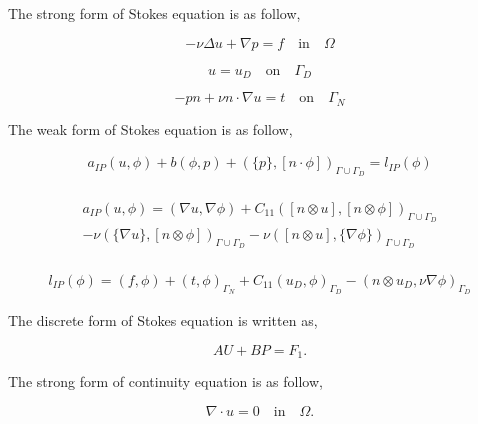 \documentclass[a4paper,12pt]{book}
\begin{document}
The strong form of Stokes equation is as follow,

\begin{equation} \label{stokes_strong_form_ch3}
-\nu \Delta u + \nabla p = f \quad \textrm{in} \quad \Omega
\end{equation}

\begin{equation} \label{dirichlet condition stokes_ch3}
u = u_D \quad \textrm{on} \quad \Gamma_D
\end{equation}

\begin{equation} \label{neumann condition stokes_ch3}
-pn + \nu n \cdot \nabla u = t \quad \textrm{on} \quad \Gamma_N
\end{equation}

The weak form of Stokes equation is as follow,

\begin{equation}\label{stokes_weak_ch3}
\begin{split}
a_{IP}(u,\phi) + b(\phi,p) + (\{p\},[n\cdot \phi])_{\Gamma \cup \Gamma_D} = l_{IP}(\phi) 
\end{split}
\end{equation}
\\
\begin{equation}
\begin{split}
a_{IP}(u,\phi) = (\nabla u, \nabla \phi) + C_{11} ([n \otimes u],[n \otimes \phi])_{\Gamma \cup \Gamma_D} \\
- \nu (\{\nabla u\},[n \otimes \phi])_{\Gamma \cup \Gamma_D} - \nu ([n \otimes u],\{\nabla \phi\})_{\Gamma \cup \Gamma_D}
\end{split}
\end{equation}
\\
\begin{equation}
\begin{split}
l_{IP}(\phi) = (f,\phi) + (t,\phi)_{\Gamma_N} + C_{11} (u_D,\phi)_{\Gamma_D} - (n \otimes u_D, \nu \nabla \phi)_{\Gamma_D}
\end{split}
\end{equation}

The discrete form of Stokes equation is written as,

\begin{equation} \label{stokes discrete_ch3}
AU + BP = F_1 \textrm{.}
\end{equation}

The strong form of continuity equation is as follow,

\begin{equation}
\nabla \cdot u = 0 \quad \textrm{in} \quad \Omega \textrm{.}
\end{equation}
\end{document}
